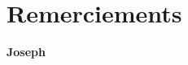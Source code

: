 \clearpage
\section*{Remerciements}
\label{sec:remerciements}


\vspace{0.5cm}



\vspace{0.5cm}

\vspace{0.5cm}


\vspace{0.5cm}


\newpage
\thispagestyle{empty}
\strut
\markboth{}{}
\newpage

\vspace{0.5cm}


\vspace{0.5cm}


\vspace{0.5cm}

\vspace{3cm}
\noindent
\textbf{Joseph} 

\newpage
\thispagestyle{empty}
\strut
\markboth{}{}
